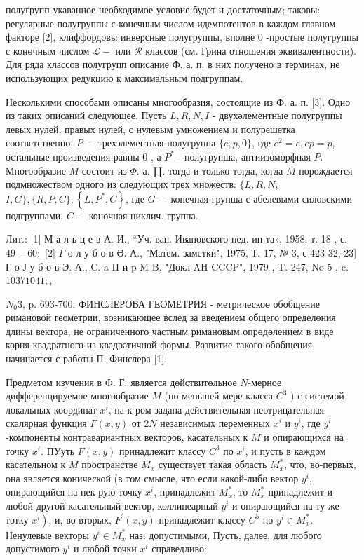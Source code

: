 \documentclass[10pt]{article}
\begin{document}
полугрупп укаванное необходимое условие будет и достаточным; таковы: регулярные полугруппы с конечным числом идемпотентов в каждом главном факторе [2], клиффордовы инверсные полугруппы, вполне 0 -простые полугруппы с конөчным числом $\mathscr{L}-$ или $\mathscr{R}$ классов (см. Грина отношения эквивалентности). Для ряда классов полугрупп описание Ф. а. п. в них получено в терминах, не использующих редукцию к максимальным подгруппам.



Несколькими способами описаны многообразия, состоящие из Ф. а. п. [3]. Одно из таких описаний следующее. Пусть $L, R, N, I$ - двухәлементные полугруппы левых нулей, правых нулей, с нулевым умножением и полурешетка соответственно, $P-$ трехэлементная полугруппа $\{e, p, 0\}$, где $e^{2}=e, e p=p$, остальные произведения равны 0 , а $P^{*}$ - полугрупша, антиизоморфная $P$. Многообразие $M$ состоит из $\Phi$. а. $\amalg$. тогда и только тогда, когда $M$ порождается подмножеством одного из следующих трех множеств: $\{L, R, N$, $I, G\},\{R, P, C\},\left\{L, P^{*}, C\right\}$, где $G-$ конечная групша с абелевыми силовскими подгруппами, $C-$ конөчная циклич. группа.



Лит.: [1] М а л ь ц е в А. И., “Уч. вап. Ивановского пед. ин-та», 1958, т. 18 , с. $49-60 ;$ [2] $\Gamma$ о л у б о в Ә. А., "Матем. заметки", 1975, Т. 17, № 3, с 423-32, 23] Г о Ј у б о в Э. А., C. a II и p M B, "Докл AH CCCP", 1979 , T. 247, No 5 , c. 1037$1041 ;$,

$N_{0} 3$, p. 693-700. ФИНСЛЕРОВА ГЕОМЕТРИЯ - метрическоө обобщение римановой геометрии, возникающее вслед за введением общего определөния длины вектора, не ограниченного частным римановым опрөдөлением в виде корня квадратного из квадратичной формы. Развитие такого обобщения начинается с работы П. Финслера [1].



Предметом изучения в Ф. Г. является дөйствитөльное $N$-мерное дифференцируемое многообразие $M$ (по меньшей мере класса $C^{3}$ ) с системой локальных координат $x^{i}$, на к-ром задана действительная неотрицательная скалярная функция $F(x, y)$ от $2 N$ независимых переменных $x^{i}$ и $y^{i}$, где $y^{i}$-компоненты контравариантных векторов, касательных к $M$ и опирающихся на точку $x^{i}$. ПУуть $F(x, y)$ принадлежит классу $C^{3}$ по $x^{i}$, и пусть в каждом касательном к $M$ пространстве $M_{x}$ существует такая область $M_{x}^{*}$, что, во-первых, она является конической (в том смысле, что если какой-либо вектор $y^{i}$, опирающийся на нек-рую точку $x^{i}$, принадлежит $M_{x}^{*}$, то $M_{x}^{*}$ принадлежит и любой другой касательный вектор, коллинеарный $y^{i}$ и опирающийся на ту же тотку $\left.x^{i}\right)$, и, во-вторых, $F^{\prime}(x, y)$ принадлежит классу $C^{5}$ по $y^{i} \in M_{x}^{*}$. Ненулевые векторы $y^{i} \in M_{x}^{*}$ наз. допустимыми, Пусть, далее, для любого допустимого $y^{i}$ и любой точки $x^{i}$ справедливо:
\end{document}
